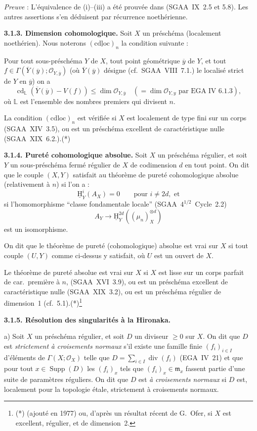 \documentclass[11pt]{article}
\DeclareMathOperator{\Supp}{Supp}
\providecommand{\cO}{\mathcal{O}}
\providecommand{\fm}{\mathfrak{m}}
\renewcommand{\H}{\mathrm{H}}
\DeclareMathOperator{\cd}{cd}
\newcommand{\ol}[1]{\overline{#1}}
\providecommand{\Supp}{\operatorname{Supp}}
\providecommand{\fm}{\mathfrak m}
\begin{document}
\emph{Preuve} : L'équivalence de (i)--(iii) a été prouvée dans (SGAA~IX~2.5 et 5.8). Les autres assertions s'en déduisent par récurrence noethérienne.

\textbf{3.1.3. Dimension cohomologique.} Soit $X$ un préschéma (localement noethérien). Nous noterons $(\underline{\mathrm{cdloc}})_n$ la condition suivante :

Pour tout sous-préschéma $Y$ de $X$, tout point géométrique $\ol{y}$ de $Y$, et tout 
$f \in \Gamma(\ol{Y}(\ol{y}); \cO_{Y,\ol{y}})$ (où $\ol{Y}(\ol{y})$
désigne (cf.~SGAA~VIII~7.1.) le localisé strict de $Y$ en $\ol{y}$) on a
\[
\cd_{\mathbb{L}}(\ol{Y}(\ol{y}) - V(f)) \leqslant \dim \cO_{Y,\ol{y}} \quad (= \dim \cO_{Y,y} \text{ par EGA~IV~6.1.3}),
\]
où $\mathbb{L}$ est l'ensemble des nombres premiers qui divisent $n$.

La condition $(\mathrm{cdloc})_n$ est vérifiée si $X$ est localement de type fini sur un corps (SGAA~XIV~3.5), ou est un préschéma excellent de caractéristique nulle (SGAA~XIX~6.2.).(*)

\textbf{3.1.4. Pureté cohomologique absolue.} Soit $X$ un préschéma régulier, et soit $Y$ un sous-préschéma fermé régulier de $X$ de codimension $d$ en tout point. On dit que le couple $(X,Y)$ satisfait au théorème de pureté cohomologique absolue (relativement à $n$) si l'on a :
\[
\underline{\H}^i_Y(A_X) = 0 \qquad \text{pour } i \neq 2d, \text{ et}
\]
si l'homomorphisme ``classe fondamentale locale'' (SGAA~$4^{1/2}$~Cycle~2.2)
\[
A_Y \longrightarrow \underline{\H}^{2d}_Y((\mu_n)^{\otimes d}_X)
\]
est un isomorphisme.

On dit que le théorème de pureté (cohomologique) absolue est vrai sur $X$ si tout couple $(U,Y)$ comme ci-dessus y satisfait, où $U$ est un ouvert de $X$.

Le théorème de pureté absolue est vrai sur $X$ si $X$ est lisse sur un corps parfait de car.~première à $n$, (SGAA~XVI~3.9), ou est un préschéma excellent de caractéristique nulle (SGAA~XIX~3.2), ou est un préschéma régulier de dimension~1 (cf.~5.1).(*)\footnote{(*) (ajouté en 1977) ou, d'après un résultat récent de G.~Ofer, si $X$ est excellent, régulier, et de dimension~2.}

\textbf{3.1.5. Résolution des singularités à la Hironaka.}

a) Soit $X$ un préschéma régulier, et soit $D$ un diviseur $\geqslant 0$ sur $X$. On dit que $D$ est \emph{strictement à croisements normaux} s'il existe une famille finie $(f_i)_{i \in I}$ d'éléments de $\Gamma(X; \cO_X)$ telle que $D = \sum_{i \in I} \operatorname{div}(f_i)$ (EGA~IV~21) et que pour tout $x \in \Supp(D)$ les $(f_i)_x$ tels que $(f_i)_x \in \fm_x$ fassent partie d'une suite de paramètres réguliers. On dit que $D$ est \emph{à croisements normaux} si $D$ est, localement pour la topologie étale, strictement à croisements normaux.
\end{document}
